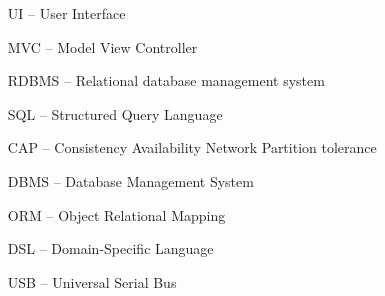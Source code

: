 \begin{itemize}[leftmargin=2cm, topsep=0pt, partopsep=5pt,itemsep=0pt,parsep=0pt]
\item[UI --] User Interface
\item[MVC --] Model View Controller
\item[RDBMS --] Relational database management system
\item[SQL --] Structured Query Language
\item[CAP --] Consistency Availability Network Partition tolerance
\item[DBMS --] Database Management System
\item[ORM --] Object Relational Mapping
\item[DSL --] Domain-Specific Language
\item[USB --] Universal Serial Bus
\end{itemize}